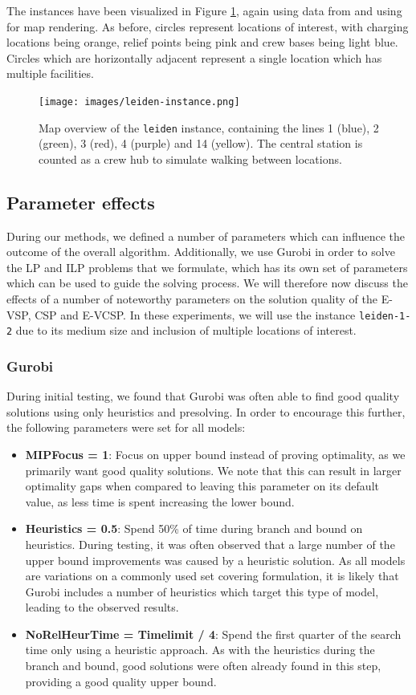 \documentclass[]{article}
\begin{document}
The instances have been visualized in Figure \ref{fig:leiden-map}, again using data from \citet{OpenStreetMap2025} and using \citet{QGIS2025} for map rendering. As before, circles represent locations of interest, with charging locations being orange, relief points being pink and crew bases being light blue. Circles which are horizontally adjacent represent a single location which has multiple facilities.

\begin{figure}[h]
  \centering
  \texttt{[image: images/leiden-instance.png]}
  \caption{Map overview of the \texttt{leiden} instance, containing the lines 1 (blue), 2 (green), 3 (red), 4 (purple) and 14 (yellow). The central station is counted as a crew hub to simulate walking between locations.}
  \label{fig:leiden-map}
\end{figure}

\subsection{Parameter effects} \label{sec:parameter-selection}
During our methods, we defined a number of parameters which can influence the outcome of the overall algorithm. Additionally, we use Gurobi in order to solve the LP and ILP problems that we formulate, which has its own set of parameters which can be used to guide the solving process. We will therefore now discuss the effects of a number of noteworthy parameters on the solution quality of the E-VSP, CSP and E-VCSP. In these experiments, we will use the instance \texttt{leiden-1-2} due to its medium size and inclusion of multiple locations of interest. 

\subsubsection{Gurobi}
During initial testing, we found that Gurobi was often able to find good quality solutions using only heuristics and presolving. In order to encourage this further, the following parameters were set for all models: 
\begin{itemize}
  \item \textbf{MIPFocus = 1}: Focus on upper bound instead of proving optimality, as we primarily want good quality solutions. We note that this can result in larger optimality gaps when compared to leaving this parameter on its default value, as less time is spent increasing the lower bound.
  \item \textbf{Heuristics = 0.5}: Spend 50\% of time during branch and bound on heuristics. During testing, it was often observed that a large number of the upper bound improvements was caused by a heuristic solution. As all models are variations on a commonly used set covering formulation, it is likely that Gurobi includes a number of heuristics which target this type of model, leading to the observed results. 
  \item \textbf{NoRelHeurTime = Timelimit / 4}: Spend the first quarter of the search time only using a heuristic approach. As with the heuristics during the branch and bound, good solutions were often already found in this step, providing a good quality upper bound.
\end{itemize} 
\end{document}
